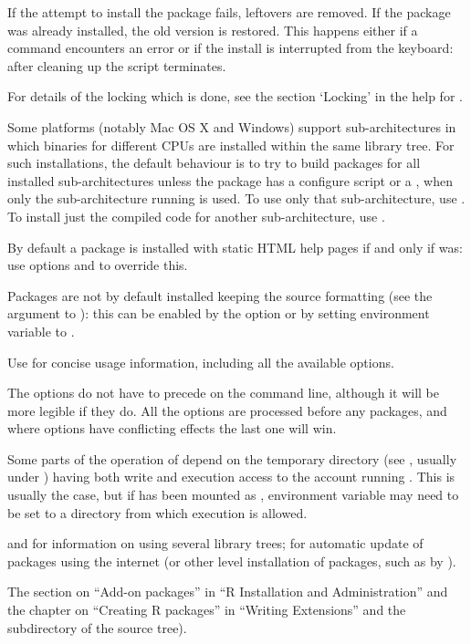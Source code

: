 \begin{Details}
If the attempt to install the package fails, leftovers are removed.
If the package was already installed, the old version is restored.
This happens either if a command encounters an error or if the
install is interrupted from the keyboard: after cleaning up the script
terminates.

For details of the locking which is done, see the section
`Locking' in the help for .


Some platforms (notably Mac OS X and Windows) support
sub-architectures in which binaries for different CPUs are installed
within the same library tree. For such installations, the default
behaviour is to try to build packages for all installed
sub-architectures unless the package has a configure script or a
, when only the sub-architecture running  is used.  To use only that sub-architecture, use
.  To install just the compiled code for
another sub-architecture, use .

By default a package is installed with static HTML help pages if and
only if \R{} was: use options  and  to
override this.

Packages are not by default installed keeping the source formatting
(see the  argument to ): this
can be enabled by the option  or by setting
environment variable  to .

Use  for concise usage information,
including all the available options.
\end{Details}
%
\begin{Note}\relax
The options do not have to precede  on the command line,
although it will be more legible if they do.  All the options are
processed before any packages, and where options have conflicting
effects the last one will win.

Some parts of the operation of  depend on the \R{}
temporary directory (see , usually under
) having both write and execution access to the account
running \R{}.  This is usually the case, but if  has been
mounted as , environment variable  may need
to be set to a directory from which execution is allowed.
\end{Note}
%
\begin{SeeAlso}\relax
{} and  for information on
using several library trees;
 for automatic update of packages using
the internet (or other \R{} level installation of packages, such as by
).

The section on ``Add-on packages'' in ``R Installation and
Administration'' and the chapter on ``Creating R packages'' in
``Writing \R{} Extensions''
 and the  subdirectory of the
\R{} source tree).
\end{SeeAlso}
